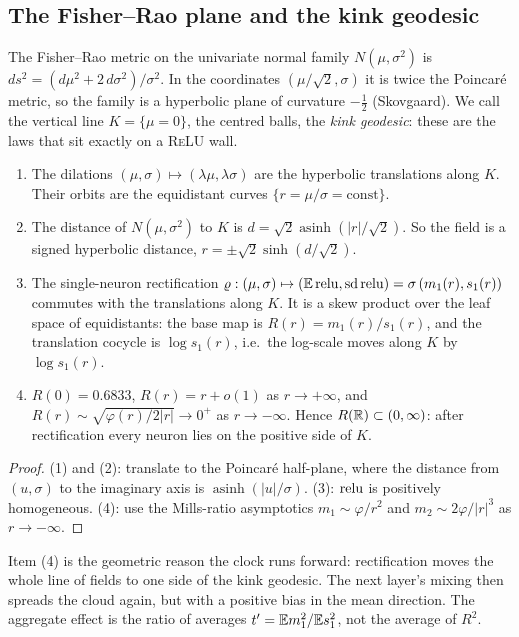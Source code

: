 \label{sec:hyper}
\subsection{The Fisher--Rao plane and the kink geodesic}
The Fisher--Rao metric on the univariate normal family $N(\mu,\sigma^2)$ is $ds^2=(d\mu^2+2\,d\sigma^2)/\sigma^2$. In the coordinates
$(\mu/\sqrt2,\sigma)$ it is twice the Poincar\'e metric, so the family is a hyperbolic plane of curvature $-\frac12$ (Skovgaard). We call
the vertical line $K=\{\mu=0\}$, the centred balls, the \emph{kink geodesic}: these are the laws that sit exactly on a \textsc{ReLU}
wall.
\begin{proposition}[proved]\label{prop:hyper}
\begin{enumerate}[leftmargin=*]
\item The dilations $(\mu,\sigma)\mapsto(\lambda\mu,\lambda\sigma)$ are the hyperbolic translations along $K$. Their orbits are the
equidistant curves $\{r=\mu/\sigma=\mathrm{const}\}$.
\item The distance of $N(\mu,\sigma^2)$ to $K$ is $d=\sqrt2\operatorname{asinh}(|r|/\sqrt2)$. So the field is a signed hyperbolic distance,
$r=\pm\sqrt2\sinh(d/\sqrt2)$.
\item The single-neuron rectification $\varrho:(\mu,\sigma)\mapsto(\mathbb E\operatorname{relu},\operatorname{sd}\operatorname{relu})=\sigma\,(m_1(r),s_1(r))$ commutes with the
translations along $K$. It is a skew product over the leaf space of equidistants: the base map is $R(r)=m_1(r)/s_1(r)$, and the
translation cocycle is $\log s_1(r)$, i.e.\ the log-scale moves along $K$ by $\log s_1(r)$.
\item $R(0)=0.6833$, $R(r)=r+o(1)$ as $r\to+\infty$, and $R(r)\sim\sqrt{\varphi(r)/2|r|}\to0^+$ as $r\to-\infty$. Hence $R(\mathbb R)\subset(0,\infty)$:
after rectification every neuron lies on the positive side of $K$.
\end{enumerate}
\end{proposition}
\begin{proof}
(1) and (2): translate to the Poincar\'e half-plane, where the distance from $(u,\sigma)$ to the imaginary axis is $\operatorname{asinh}(|u|/\sigma)$.
(3): $\operatorname{relu}$ is positively homogeneous. (4): use the Mills-ratio asymptotics $m_1\sim\varphi/r^2$ and $m_2\sim2\varphi/|r|^3$ as $r\to-\infty$.
\end{proof}
Item (4) is the geometric reason the clock runs forward: rectification moves the whole line of fields to one side of the kink
geodesic. The next layer's mixing then spreads the cloud again, but with a positive bias in the mean direction. The aggregate effect
is the ratio of averages $t'=\mathbb E m_1^2/\mathbb E s_1^2$, not the average of $R^2$.

